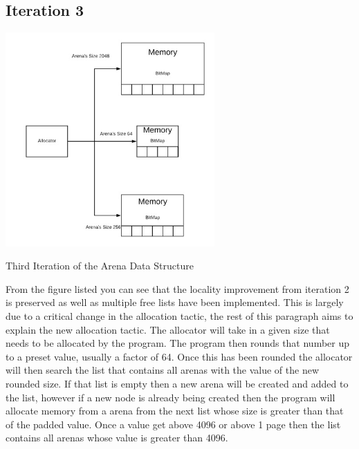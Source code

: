 \documentclass[conference]{IEEEtran}
\begin{document}
\subsection{Iteration 3}
\includegraphics[width=8cm]{Iteration3datastructure.jpg}
\caption{Third Iteration of the Arena Data Structure}
\label{fig3:Iteration3}
From the figure listed you can see that the locality improvement from iteration 2 is preserved as well as multiple free lists have been implemented. This is largely due to a critical change in the allocation tactic, the rest of this paragraph aims to explain the new allocation tactic. The allocator will take in a given size that needs to be allocated by the program. The program then rounds that number up to a preset value, usually a factor of 64. Once this has been rounded the allocator will then search the list that contains all arenas with the value of the new rounded size. If that list is empty then a new arena will be created and added to the list, however if a new node is already being created then the program will allocate memory from a arena from the next list whose size is greater than that of the padded value. Once a value get above 4096 or above 1 page then the list contains all arenas whose value is greater than 4096. 
\end{document}
